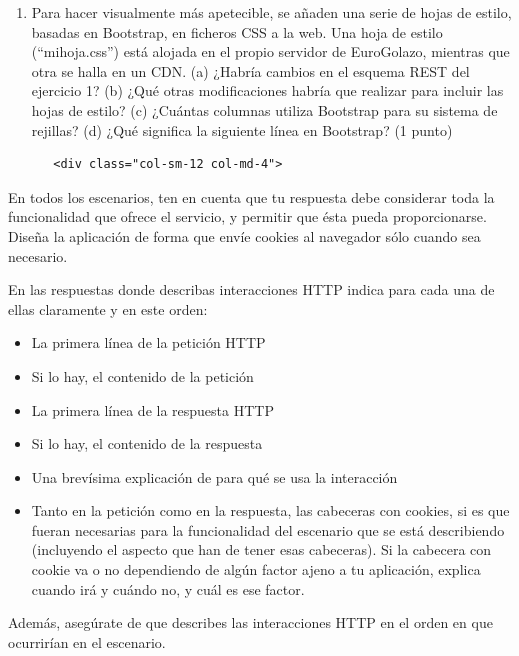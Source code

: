 \begin{enumerate}
  \item Para hacer visualmente más apetecible, se añaden una serie de hojas de estilo, basadas en Bootstrap, en ficheros CSS a la web. Una hoja de estilo (``mihoja.css'') está alojada en el propio servidor de EuroGolazo, mientras que otra se halla en un CDN. (a) ¿Habría cambios en el esquema REST del ejercicio 1? (b) ¿Qué otras modificaciones habría que realizar para incluir las hojas de estilo? (c) ¿Cuántas columnas utiliza Bootstrap para su sistema de rejillas? (d) ¿Qué significa la siguiente línea en Bootstrap? (1 punto)
  
\begin{verbatim}
   <div class="col-sm-12 col-md-4">
\end{verbatim}

\end{enumerate}

En todos los escenarios, ten en cuenta que tu respuesta debe considerar toda la funcionalidad que ofrece el servicio, y permitir que ésta pueda proporcionarse. Diseña la aplicación de forma que envíe cookies al navegador sólo cuando sea necesario.

En las respuestas donde describas interacciones HTTP indica para cada una de ellas claramente y en este orden:
  \begin{itemize}
  \item La primera línea de la petición HTTP
  \item Si lo hay, el contenido de la petición
  \item La primera línea de la respuesta HTTP
  \item Si lo hay, el contenido de la respuesta
  \item Una brevísima explicación de para qué se usa la interacción
  \item Tanto en la petición como en la respuesta, las cabeceras con cookies, si es que fueran necesarias para la funcionalidad del escenario que se está describiendo (incluyendo el aspecto que han de tener esas cabeceras). Si la cabecera con cookie va o no dependiendo de algún factor ajeno a tu aplicación, explica cuando irá y cuándo no, y cuál es ese factor.
  \end{itemize}

Además, asegúrate de que describes las interacciones HTTP en el orden en que ocurrirían en el escenario.

